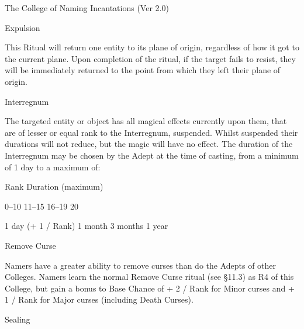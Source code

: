 \begin{Chapter}{The College of Naming Incantations (Ver 2.0)}
\begin{ritual}[R-2]{Expulsion}
\begin{effects}
This Ritual will return one entity to its plane of origin, regardless
of how it got to the current plane. Upon completion of the ritual, if
the target fails to resist, they will be immediately returned to the
point from which they left their plane of origin.
\end{effects}
\end{ritual}

\begin{ritual}[R-3]{Interregnum}

\begin{effects}
The targeted entity or object has all magical effects currently upon
them, that are of lesser or equal rank to the Interregnum, suspended.
Whilst suspended their durations will not reduce, but the magic will
have no effect.  The duration of the Interregnum may be chosen by the
Adept at the time of casting, from a minimum of 1 day to a maximum of:

Rank  Duration (maximum) 

0–10 
11–15 
16–19 
20 

1 day (+ 1 / Rank) 
1 month 
3 months 
1 year 

\end{effects}
\end{ritual}

\begin{ritual}[R-4]{Remove Curse}

\begin{effects}
Namers have a greater ability to remove curses than do the Adepts of
other Colleges. Namers learn the normal Remove Curse ritual (see
§11.3) as R4 of this College, but gain a bonus to Base Chance of + 2 /
Rank for Minor curses and + 1 / Rank for Major curses (including Death
Curses).
\end{effects}
\end{ritual}

\begin{ritual}[R-5]{Sealing}


\end{ritual}
\end{Chapter}
